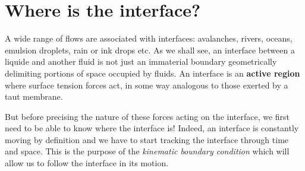 \section{Where is the interface?}
A wide range of flows are associated with interfaces: avalanches, rivers, oceans, emulsion droplets, rain or ink drops etc. As we shall see, an interface between a liquide and another fluid is not just an immaterial boundary geometrically delimiting portions of space occupied by fluids. An interface is an \textbf{active region} where surface tension forces act, in some way analogous to those exerted by a taut membrane.

But before precising the nature of these forces acting on the interface, we first need to be able to know where the interface is! Indeed, an interface is constantly moving by definition and we have to start tracking the interface through time and space. This is the purpose of the \textit{kinematic boundary condition} which will allow us to follow the interface in its motion.

